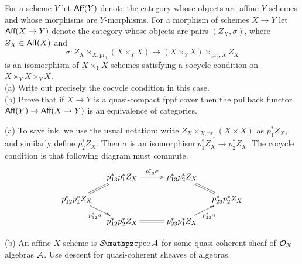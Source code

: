 \begin{exercise}[3.3]
  For a scheme $Y$ let $\text{\sf Aff}(Y)$ denote the category whose objects are affine
  $Y$-schemes and whose morphisms are $Y$-morphisms. For a morphism of schemes $X\to Y$
  let $\text{\sf Aff}(X\to Y)$ denote the category whose objects are pairs $(Z_X,\sigma)$, where
  $Z_X\in \text{\sf Aff}(X)$ and
  \[
     \sigma:Z_X\times_{X,\textrm{pr}_1} (X\times_Y X)\to
     (X\times_Y X)\times_{\textrm{pr}_2,X} Z_X
  \]
  is an isomorphism of $X\times_Y X$-schemes satisfying a cocycle condition on
  $X\times_Y X\times_Y X$.\\
  (a) Write out precisely the cocycle condition in this case.\\
  (b) Prove that if $X\to Y$ is a quasi-compact fppf cover then the pullback functor
  $\text{\sf Aff}(Y)\to \text{\sf Aff}(X\to Y)$ is an equivalence of categories.
\end{exercise}
\begin{solution}
  (a) To save ink, we use the usual notation: write $Z_X\times_{X,\textrm{pr}_1}(X\times X)$
  as $p_1^* Z_X$, and similarly define $p_2^* Z_X$. Then $\sigma$ is an isomorphism
  $p_1^*Z_X\to p_2^*Z_X$. The cocycle condition is that following diagram must commute.
  \[\xymatrix @R-1pc @C-1pc {
   &
   p_{13}^*p_1^*Z_X \ar[rr]^{p_{13}^*\sigma} \ar@{=}[dl] & &
   p_{13}^*p_2^*Z_X \ar@{=}[dr]
   &
   \\
   p_{12}^*p_1^*Z_X \ar[dr]_{p_{12}^*\sigma} & & & &
   p_{23}^*p_2^*Z_X \\
   &
   p_{12}^*p_2^*Z_X \ar@{=}[rr] & &
   p_{23}^*p_1^*Z_X \ar[ur]_{p_{23}^*\sigma}\\
  }\]

  (b)  An affine $X$-scheme is $\Spec\A$ for some quasi-coherent sheaf of
  $\mathcal{O}_X$-algebras $\mathcal{A}$. Use descent for quasi-coherent sheaves of algebras.
\end{solution}

